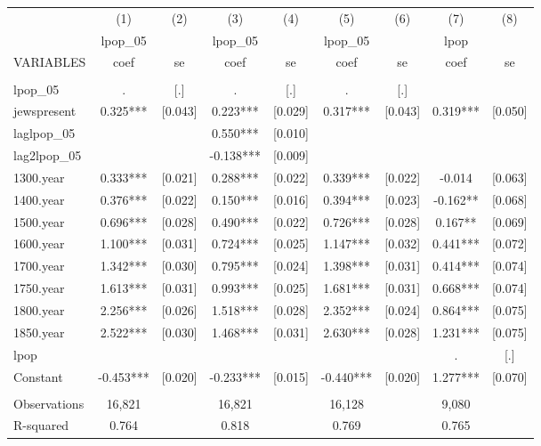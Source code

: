 \documentclass[landscape]{article}
\begin{document}
\begin{tabular}{lcccccccc} \hline
 & (1) & (2) & (3) & (4) & (5) & (6) & (7) & (8) \\
 & lpop\_05 &  & lpop\_05 &  & lpop\_05 &  & lpop &  \\
VARIABLES & coef & se & coef & se & coef & se & coef & se \\ \hline
 &  &  &  &  &  &  &  &  \\
lpop\_05 & . & [.] & . & [.] & . & [.] &  &  \\
jewspresent & 0.325*** & [0.043] & 0.223*** & [0.029] & 0.317*** & [0.043] & 0.319*** & [0.050] \\
laglpop\_05 &  &  & 0.550*** & [0.010] &  &  &  &  \\
lag2lpop\_05 &  &  & -0.138*** & [0.009] &  &  &  &  \\
1300.year & 0.333*** & [0.021] & 0.288*** & [0.022] & 0.339*** & [0.022] & -0.014 & [0.063] \\
1400.year & 0.376*** & [0.022] & 0.150*** & [0.016] & 0.394*** & [0.023] & -0.162** & [0.068] \\
1500.year & 0.696*** & [0.028] & 0.490*** & [0.022] & 0.726*** & [0.028] & 0.167** & [0.069] \\
1600.year & 1.100*** & [0.031] & 0.724*** & [0.025] & 1.147*** & [0.032] & 0.441*** & [0.072] \\
1700.year & 1.342*** & [0.030] & 0.795*** & [0.024] & 1.398*** & [0.031] & 0.414*** & [0.074] \\
1750.year & 1.613*** & [0.031] & 0.993*** & [0.025] & 1.681*** & [0.031] & 0.668*** & [0.074] \\
1800.year & 2.256*** & [0.026] & 1.518*** & [0.028] & 2.352*** & [0.024] & 0.864*** & [0.075] \\
1850.year & 2.522*** & [0.030] & 1.468*** & [0.031] & 2.630*** & [0.028] & 1.231*** & [0.075] \\
lpop &  &  &  &  &  &  & . & [.] \\
Constant & -0.453*** & [0.020] & -0.233*** & [0.015] & -0.440*** & [0.020] & 1.277*** & [0.070] \\
 &  &  &  &  &  &  &  &  \\
Observations & 16,821 &  & 16,821 &  & 16,128 &  & 9,080 &  \\
 R-squared & 0.764 &  & 0.818 &  & 0.769 &  & 0.765 &  \\ \hline
\end{tabular}
\end{document}
